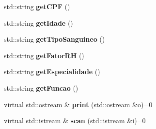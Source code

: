 \begin{DoxyCompactItemize}
\item 
\mbox{\label{classFuncionario_a15ca65608f1e7345ca5f99e79cdfa33b}} 
std\+::string {\bfseries get\+C\+PF} ()
\item 
\mbox{\label{classFuncionario_ac13a8bc1dd2425b3e316f0432e093a66}} 
std\+::string {\bfseries get\+Idade} ()
\item 
\mbox{\label{classFuncionario_a871dfd5403d3d3c026c35b62ee2bb6a9}} 
std\+::string {\bfseries get\+Tipo\+Sanguineo} ()
\item 
\mbox{\label{classFuncionario_adce524ef7422ef2bcc1b84c939f2d177}} 
std\+::string {\bfseries get\+Fator\+RH} ()
\item 
\mbox{\label{classFuncionario_a98b261893ff916049db28530d3ba1160}} 
std\+::string {\bfseries get\+Especialidade} ()
\item 
\mbox{\label{classFuncionario_a8e67899ba0fa720b95c0b292cfd6fe90}} 
std\+::string {\bfseries get\+Funcao} ()
\item 
\mbox{\label{classFuncionario_ae300f2d29776f6173d3267b314e31f24}} 
virtual std\+::ostream \& {\bfseries print} (std\+::ostream \&o)=0
\item 
\mbox{\label{classFuncionario_a615fd3db161ffe4425ec1bff06f1853f}} 
virtual std\+::istream \& {\bfseries scan} (std\+::istream \&i)=0
\end{DoxyCompactItemize}

